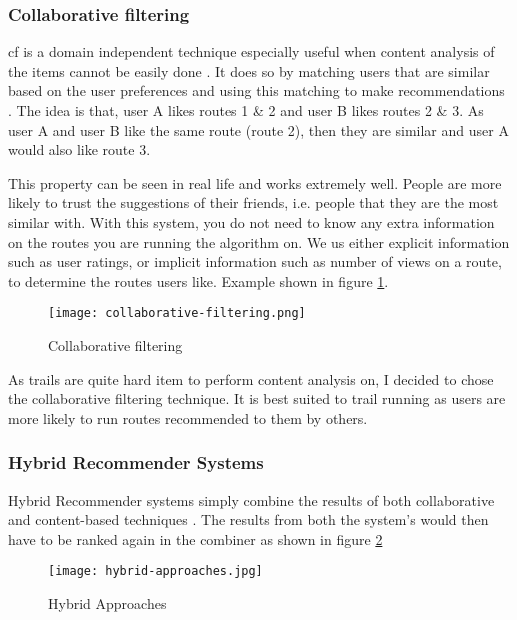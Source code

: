 \subsubsection{Collaborative filtering}
\acrfull{cf} is a domain independent technique especially useful when content analysis of the items cannot be easily done \cite{isinkaye2015recommendation}. It does so by matching users that are similar based on the user preferences and using this matching to make recommendations \cite{herlocker2004evaluating}. The idea is that, user A likes routes 1 \& 2 and user B likes routes 2 \& 3. As user A and user B like the same route (route 2), then they are similar and user A would also like route 3. 

This property can be seen in real life and works extremely well. People are more likely to trust the suggestions of their friends, i.e. people that they are the most similar with. With this system, you do not need to know any extra information on the routes you are running the algorithm on. We us either explicit information such as user ratings, or implicit information such as number of views on a route, to determine the routes users like. Example shown in figure \ref{fig:collaborativeFiltering}.

\begin{figure}[ht]
    \centering
    \texttt{[image: collaborative-filtering.png]}
    \caption{Collaborative filtering}
    \label{fig:collaborativeFiltering}
\end{figure}

As trails are quite hard item to perform content analysis on, I decided to chose the collaborative filtering technique. It is best suited to trail running as users are more likely to run routes recommended to them by others.

\subsubsection{Hybrid Recommender Systems}
Hybrid Recommender systems simply combine the results of both collaborative and content-based techniques \cite{claypool1999combing}. The results from both the system's would then have to be ranked again in the combiner as shown in figure \ref{fig:hybridRecommenderSystems}

\begin{figure}[ht]
    \centering
    \texttt{[image: hybrid-approaches.jpg]}
    \caption{Hybrid Approaches}
    \label{fig:hybridRecommenderSystems}
\end{figure}

